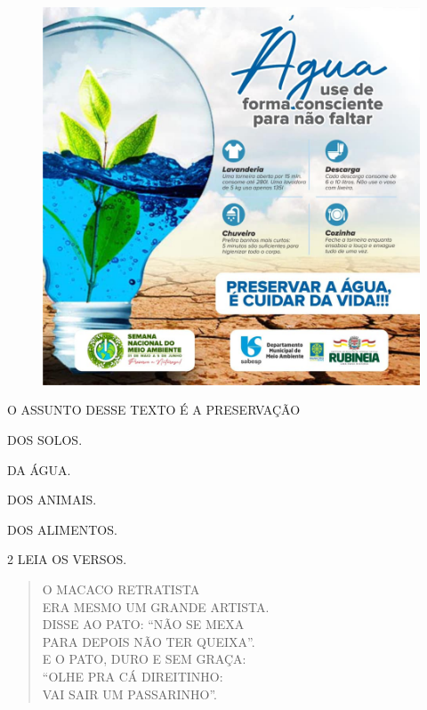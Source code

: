 \begin{figure}[H]
\centering
\includegraphics[width=\textwidth]{media/image166.jpg}
\end{figure}

O ASSUNTO DESSE TEXTO É A PRESERVAÇÃO

\begin{multicols}{2}
\begin{escolha}
\item DOS SOLOS.

\item DA ÁGUA.

\item DOS ANIMAIS.

\item DOS ALIMENTOS.
\end{escolha}
\end{multicols}

\pagebreak

\num{2} LEIA OS VERSOS.

\begin{myquote}
\begin{verse}
O MACACO RETRATISTA\\
ERA MESMO UM GRANDE ARTISTA.\\
DISSE AO PATO: ``NÃO SE MEXA\\
PARA DEPOIS NÃO TER QUEIXA''.\\
E O PATO, DURO E SEM GRAÇA:\\
``OLHE PRA CÁ DIREITINHO:\\
VAI SAIR UM PASSARINHO''.
\end{verse}

\end{myquote}

